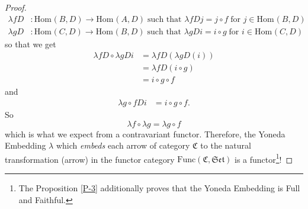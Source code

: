 \documentclass{article}
\theoremstyle{definition}
\theoremstyle{remark}
\theoremstyle{definition}
\theoremstyle{definition}
\theoremstyle{definition}
\newcommand{\cat}[1]{\mathfrak{#1}}
\newcommand{\homset}[3]{\text{Hom}_{#1}(#2,#3)}
\newcommand{\Func}[2]{\text{Func}\left (#1,#2\right )}
\begin{document}
\begin{proof}
\begin{equation*}
\begin{split}
			\lambda  f D&: \homset{}{B}{D} \to \homset{}{A}{D}\;\text{such that }\lambda f D j = j\circ f\;\text{for } j\in \homset{}{B}{D}\\
				\lambda  g D&: \homset{}{C}{D} \to \homset{}{B}{D}\;\text{such that }\lambda g D i = i\circ g\;\text{for } i\in \homset{}{C}{D}
	\end{split}
\end{equation*}
so that we get 
\begin{equation*}
	\begin{split}
		\lambda f D\circ \lambda gD i&=\lambda fD (\lambda gD(i))\\
		&= \lambda fD (i\circ g)\\
		&= i\circ g\circ f 
	\end{split}
\end{equation*}
and
\begin{equation*}
	\begin{split}
		\lambda g\circ f D i &= i\circ g\circ f.
	\end{split}
\end{equation*}
So
\[\lambda f \circ \lambda g = \lambda g\circ f\]
which is what we expect from a contravariant functor. Therefore, the Yoneda Embedding $ \lambda $ which \emph{embeds} each arrow of category $ \cat{C} $ to the natural transformation (arrow) in the functor category $ \Func{\cat{C}}{\cat{Set}} $ is a functor\footnote{The Proposition \ref{P-3} additionally proves that the Yoneda Embedding is Full and Faithful.}!
\end{proof}
%
%
\end{document}
